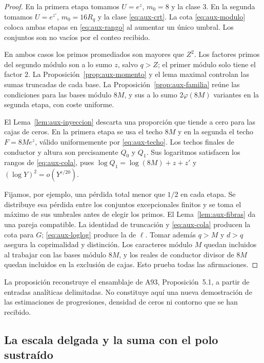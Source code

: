 \begin{proof}
En la primera etapa tomamos $U=e^z$, $m_0=8$ y la clase $3$.
En la segunda tomamos $U=e^{z'}$, $m_0=16R_q$ y la clase
\eqref{eq:aux-crt}. La cota \eqref{eq:aux-modulo} coloca ambas
etapas en \eqref{eq:aux-rango} al aumentar un único umbral.
Los conjuntos son no vacíos por el conteo recibido.

En ambos casos los primos promediados son mayores que $Z^2$.
Los factores primos del segundo módulo son a lo sumo $z$, salvo
$q>Z$; el primer módulo solo tiene el factor $2$.
La Proposición~\ref{prop:aux-momento} y el lema maximal controlan
las sumas truncadas de cada base. La Proposición~\ref{prop:aux-familia}
reúne las condiciones para las bases módulo $8M$, y sus a lo sumo
$2\varphi(8M)$ variantes en la segunda etapa, con coste uniforme.

El Lema~\ref{lem:aux-inyeccion} descarta una proporción que tiende
a cero para las cajas de ceros. En la primera etapa se usa el techo
$8M$ y en la segunda el techo $F=8Me^z$, válido uniformemente por
\eqref{eq:aux-techo}. Los techos finales de conductor y altura son
precisamente $Q_0$ y $Q_1$. Sus logaritmos satisfacen los rangos de
\eqref{eq:aux-cola}, pues
$\log Q_1=\log(8M)+z+z'$ y
$(\log Y)^2=o(Y^{\varepsilon/20})$.

Fijamos, por ejemplo, una pérdida total menor que $1/2$ en cada etapa.
Se distribuye esa pérdida entre los conjuntos excepcionales finitos y
se toma el máximo de sus umbrales antes de elegir los primos.
El Lema~\ref{lem:aux-fibras} da una pareja compatible.
La identidad de truncación y \eqref{eq:aux-cola} producen la cota
para $G$; \eqref{eq:aux-loglog} produce la de $\ell$.
Tomar además $q>M$ y $d>q$ asegura la coprimalidad y distinción.
Los caracteres módulo $M$ quedan incluidos al trabajar con las bases
módulo $8M$, y los reales de conductor divisor de $8M$ quedan
incluidos en la exclusión de cajas. Esto prueba todas las afirmaciones.
\end{proof}

La proposición reconstruye el ensamblaje de A93, Proposición~5.1,
a partir de entradas analíticas delimitadas. No constituye aquí una
nueva demostración de las estimaciones de progresiones, densidad de ceros
ni contorno que se han recibido.

\subsection{La escala delgada y la suma con el polo sustraído}

